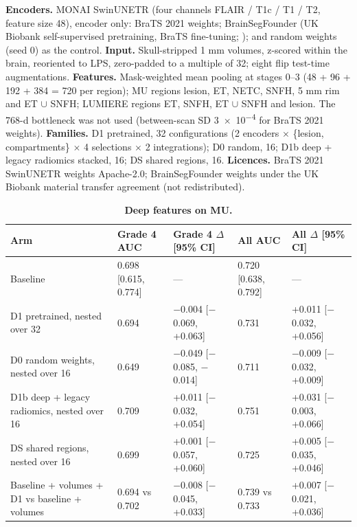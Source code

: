 \documentclass[11pt,a4paper]{article}
\begin{document}
\textbf{Encoders.} MONAI SwinUNETR (four channels FLAIR / T1c / T1 / T2, feature size 48), encoder only: BraTS
2021 weights; BrainSegFounder (UK Biobank self-supervised pretraining, BraTS fine-tuning; \citealp{cox2024}
\flag{[CHECK]}); and random weights (seed 0) as the control. \textbf{Input.} Skull-stripped 1 mm volumes,
z-scored within the brain, reoriented to LPS, zero-padded to a multiple of 32; eight flip test-time
augmentations. \textbf{Features.} Mask-weighted mean pooling at stages 0--3 (48 + 96 + 192 + 384 = 720 per
region); MU regions lesion, ET, NETC, SNFH, 5 mm rim and ET $\cup$ SNFH; LUMIERE regions ET, SNFH, ET $\cup$
SNFH and lesion. The 768-d bottleneck was not used (between-scan SD \num{3e-4} for BraTS 2021 weights).
\textbf{Families.} D1 pretrained, 32 configurations (2 encoders $\times$ \{lesion, compartments\} $\times$ 4
selections $\times$ 2 integrations); D0 random, 16; D1b deep + legacy radiomics stacked, 16; DS shared
regions, 16. \textbf{Licences.} BraTS 2021 SwinUNETR weights Apache-2.0; BrainSegFounder weights under the UK
Biobank material transfer agreement (not redistributed).

\begin{table}[H]
\centering
\footnotesize
\renewcommand{\thetable}{S10}\renewcommand{\theHtable}{S10}
\caption{\textbf{Deep features on MU.}}
\label{tab:S10}
\begin{tabularx}{\linewidth}{@{}L R{2.75cm} R{3.5cm} R{2.75cm} R{3.5cm}@{}}
\toprule
Arm & Grade 4 AUC & Grade 4 $\Delta$ [95\% CI] & All AUC & All $\Delta$ [95\% CI] \\
\midrule
Baseline & 0.698 [0.615, 0.774] & --- & 0.720 [0.638, 0.792] & --- \\
D1 pretrained, nested over 32 & 0.694 & $-$0.004 [$-$0.069, +0.063] & 0.731 & +0.011 [$-$0.032, +0.056] \\
D0 random weights, nested over 16 & 0.649 & $-$0.049 [$-$0.085, $-$0.014] & 0.711 & $-$0.009 [$-$0.032, +0.009] \\
D1b deep + legacy radiomics, nested over 16 & 0.709 & +0.011 [$-$0.032, +0.054] & 0.751 & +0.031 [$-$0.003, +0.066] \\
DS shared regions, nested over 16 & 0.699 & +0.001 [$-$0.057, +0.060] & 0.725 & +0.005 [$-$0.035, +0.046] \\
Baseline + volumes + D1 vs baseline + volumes & 0.694 vs 0.702 & $-$0.008 [$-$0.045, +0.033] & 0.739 vs 0.733 & +0.007 [$-$0.021, +0.036] \\
\bottomrule
\end{tabularx}
\end{table}
\end{document}
